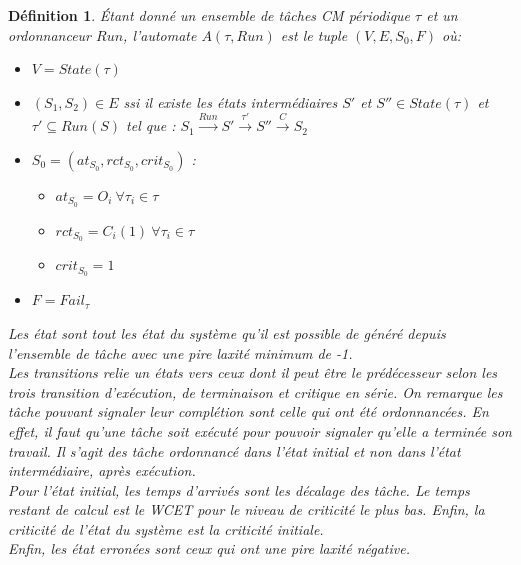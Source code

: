 \documentclass[12pt,a4paper,oneside]{book}
\theoremstyle{break}
\newtheorem{defin}{Définition}[chapter]
\theoremstyle{breakplain}
\begin{document}
\begin{defin} 
\label{per:auto}
Étant donné un ensemble de tâches CM périodique $\tau$ et un ordonnanceur $Run$, l'automate $A(\tau,Run)$ est le tuple $(V, E, S_0, F)$ où:
\begin{itemize}
\item  $V=State(\tau)$
\item $(S_1,S_2) \in E$ ssi il existe les états intermédiaires $S'$ et $S'' \in State(\tau)$ et $\tau' \subseteq Run(S) $ tel que : $S_1\xrightarrow{Run}S'\xrightarrow{\tau'}S''\xrightarrow{C}S_2$
\item $S_0 = (at_{S_0}, rct_{S_0}, crit_{S_0})$ :\begin{itemize}
\item $at_{S_0} = O_i\ \forall \tau_i \in \tau$
\item $rct_{S_0} = C_i(1)\ \forall \tau_i \in \tau$
\item $crit_{S_0} = 1$
\end{itemize}
\item $F = Fail_\tau$
\end{itemize}

Les état sont tout les état du système qu'il est possible de généré depuis l'ensemble de tâche avec une pire laxité minimum de -1.\\
Les transitions relie un états vers ceux dont il peut être le prédécesseur selon les trois transition d'exécution, de terminaison et critique en série. On remarque les tâche pouvant signaler leur complétion sont celle qui ont été ordonnancées. En effet, il faut qu'une tâche soit exécuté pour pouvoir signaler qu'elle a terminée son travail. Il s'agit des tâche ordonnancé dans l'état initial et non dans l'état intermédiaire, après exécution.\\
Pour l'état initial, les temps d'arrivés sont les décalage des tâche. Le temps restant de calcul est le WCET pour le niveau de criticité le plus bas. Enfin, la criticité de l'état du système est la criticité initiale.\\
Enfin, les état erronées sont ceux qui ont une pire laxité négative.

\end{defin} 
\end{document}
